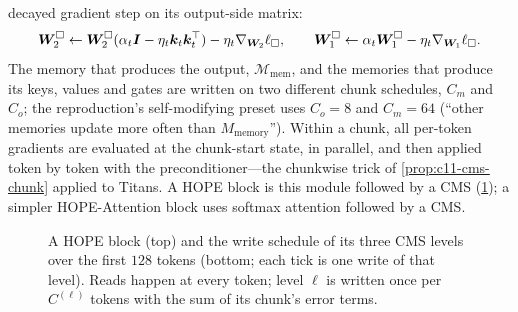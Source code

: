 decayed gradient step on its output-side matrix:
\begin{equation}
  \bm{W}^\square_2 \leftarrow \bm{W}^\square_2(\alpha_t\bm{I} - \eta_t\bm{k}_t\bm{k}_t^{\top}) - \eta_t\nabla_{\bm{W}_2}\ell_\square,
  \qquad
  \bm{W}^\square_1 \leftarrow \alpha_t\bm{W}^\square_1 - \eta_t\nabla_{\bm{W}_1}\ell_\square .
  \label{eq:c11-selfmod-update}
\end{equation}
The memory that produces the output, $\mathcal{M}_{\text{mem}}$, and the memories that produce its
keys, values and gates are written on two different chunk schedules, $C_m$ and $C_o$; the
reproduction's self-modifying preset uses $C_o = 8$ and $C_m = 64$ (``other memories update more
often than $M_{\text{memory}}$''). Within a chunk, all per-token gradients are evaluated at the
chunk-start state, in parallel, and then applied token by token with the preconditioner---the
chunkwise trick of \cref{prop:c11-cms-chunk} applied to Titans. A HOPE block is this module
followed by a CMS (\cref{fig:c11-hope}); a simpler HOPE-Attention block uses softmax attention
followed by a CMS.

\begin{figure}[t]
\centering
{}
\caption{A HOPE block (top) and the write schedule of its three CMS levels over the first
$128$ tokens (bottom; each tick is one write of that level). Reads happen at every token; level
$\ell$ is written once per $C^{(\ell)}$ tokens with the sum of its chunk's error terms.}
\label{fig:c11-hope}
\end{figure}

